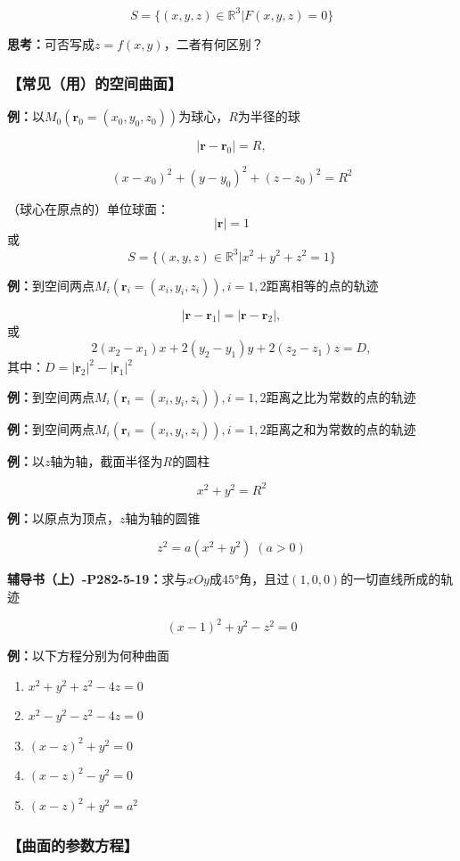 $$S=\{(x,y,z)\in\mathbb{R}^3|F(x,y,z)=0\}$$

{\bf 思考：}可否写成$z=f(x,y)$，二者有何区别？

\subsubsection{【常见（用）的空间曲面】}

{\bf 例：}以$M_0(\bm{r}_0=(x_0,y_0,z_0))$为球心，$R$为半径的球

$${|\bm{r}-\bm{r}_0|=R,}$$ 

$${(x-x_0)^2+(y-y_0)^2+(z-z_0)^2=R^2}$$ 

{（球心在原点的）单位球面：}
$$|\bm{r}|=1$$
或
$$S=\{(x,y,z)\in\mathbb{R}^3|x^2+y^2+z^2=1\}$$

{\bf 例：}到空间两点$M_i(\bm{r}_i=(x_i,y_i,z_i)),i=1,2$距离相等的点的轨迹

$${|\bm{r}-\bm{r}_1|=|\bm{r}-\bm{r}_2|},$$
或
$${2(x_2-x_1)x+2(y_2-y_1)y+2(z_2-z_1)z=D,}$$
其中：$D=|\bm{r}_2|^2-|\bm{r}_1|^2$

{\bf 例：}到空间两点$M_i(\bm{r}_i=(x_i,y_i,z_i)),i=1,2$距离之比为常数的点的轨迹

{\bf 例：}到空间两点$M_i(\bm{r}_i=(x_i,y_i,z_i)),i=1,2$距离之和为常数的点的轨迹

{\bf 例：}以$z$轴为轴，截面半径为$R$的圆柱

$$x^2+y^2=R^2$$

{\bf 例：}以原点为顶点，$z$轴为轴的圆锥

$$z^2=a(x^2+y^2)\;(a>0)$$

{\bf 辅导书（上）-P282-5-19：}求与$xOy$成$45$°角，且过$(1,0,0)$的一切直线所成的轨迹

$$(x-1)^2+y^2-z^2=0$$

{\bf 例：}以下方程分别为何种曲面
\begin{enumerate}[(1)]
  \setlength{\itemindent}{1cm}
  \item $x^2+y^2+z^2-4z=0$  
  \item $x^2-y^2-z^2-4z=0$  
  \item $(x-z)^2+y^2=0$  
  \item $(x-z)^2-y^2=0$  
  \item $(x-z)^2+y^2=a^2$ 
\end{enumerate}

\subsubsection{【曲面的参数方程】}


